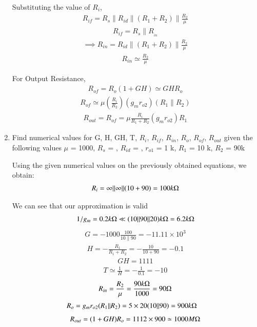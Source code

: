 \begin{enumerate}[label=\thesubsection.\arabic*.,ref=\thesubsection.\theenumi]
Substituting the value of $R_{i}$,
\begin{align}
    R_{if}=R_{s}\|R_{id}\|(R_{1}+R_{2}) \| \frac{R_{2}}{\mu}
\end{align}
\begin{align}
    R_{if}=R_{s} \| R__{in}
\end{align}
\begin{align}
    \implies R_{in}=R_{i d}\|(R_{1}+R_{2})\| \frac{R_{2}}{\mu}
\end{align}
\begin{align}
    R_{in} \simeq \frac{R_{2}}{\mu}
\end{align}

For Output Resistance,
\begin{align}
    R_{of}=R_{o}(1+GH) \simeq GH R_{o}
\end{align}
\begin{align}
    R_{of} \simeq \mu (\frac{R_{i}}{R_{2}})(g_{m} r_{o 2})(R_{1} \| R_{2})
\end{align}
\begin{align}
    R_{out} = R_{of}=\mu \frac{R_{i}}{R_{1}+R_{2}}(g_{m} r_{o 2}) R_{1}
\end{align}

\item
Find numerical values for G, H, GH, T, $R_{i}$, $R_{if}$, $R_{in}$, $R_{o}$,  $R_{of}$, $R_{out}$ given the following values
$\mu$ = 1000, $R_{s}$ = \inf, $R_{id}$ = \inf, $r_{o1}$ = 1 k\ohm,  $R_{1}$ = 10 k\ohm, $R_{2}$ = 90k\ohm

\solution
Using the given numerical values on the previously obtained equations, we obtain:
\begin{align}
    R_{i}=\infty\|\infty\|(10+90)=100 k\ohm
\end{align}

We can see that our approximation is valid
\begin{align}
    1 / g_{m}=0.2 k\ohm \ll (10\|90\| 20)k\ohm = 6.2k\ohm 
\end{align}
\begin{align}
    G =-1000 \frac{100}{10 \| 90}=-11.11 \times 10^{3}
\end{align}
\begin{align}
    H=-\frac{R_{1}}{R_{1}+R_{2}}=-\frac{10}{10+90}=-0.1
\end{align}
\begin{align}
    GH=1111
\end{align}
\begin{align}
    T \simeq \frac{1}{H} = -\frac{1}{0.1} = -10
\end{align}
\begin{align}
    R_{in}=\frac{R_{2}}{\mu}=\frac{90k\ohm}{1000}=90\ohm
\end{align}
\begin{align}
    R_{o} &=g_{m} r_{o 2}(R_{1} \| R_{2}) =5 \times 20(10 \| 90)=900k\ohm
\end{align}
\begin{align}
    R_{out}=(1+GH) R_{o}=1112 \times 900 \simeq 1000M\ohm
\end{align}

\end{enumerate}